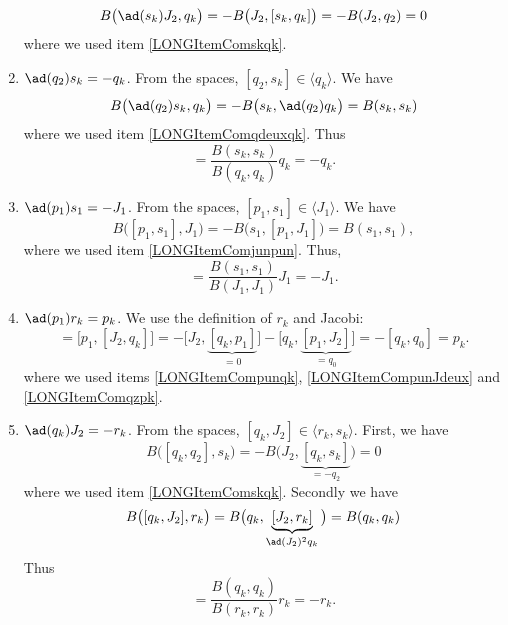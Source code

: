 \begin{enumerate}
		\begin{equation}
			B\big( \ad(s_k)J_2,q_k \big)=-B\big( J_2,[s_k,q_k] \big)=-B(J_2,q_2)=0
		\end{equation}
		where we used item \ref{LONGItemComskqk}.
	\item$\ad(q_2)s_k=-q_k$. From the spaces, $[q_2,s_k]\in\langle q_k\rangle$. We have
		\begin{equation}
			B\big( \ad(q_2)s_k,q_k \big)=-B\big( s_k,\ad(q_2)q_k \big)=B(s_k,s_k)
		\end{equation}
		where we used item \ref{LONGItemComqdeuxqk}. Thus
		\begin{equation}
			[q_2,s_k]=\frac{ B(s_k,s_k) }{ B(q_k,q_k) }q_k=-q_k.
		\end{equation}
	\item$\ad(p_1)s_1=-J_1$. From the spaces, $[p_1,s_1]\in\langle J_1\rangle$. We have
		\begin{equation}
			B\big( [p_1,s_1],J_1 \big)=-B\big( s_1,[p_1,J_1] \big)=B(s_1,s_1),
		\end{equation}
		where we used item \ref{LONGItemComjunpun}. Thus,
		\begin{equation}
			[p_1,s_1]=\frac{ B(s_1,s_1) }{ B(J_1,J_1) }J_1=-J_1.
		\end{equation}
	\item$\ad(p_1)r_k=p_k$\label{LONGItemCompunrk}. We use the definition of $r_k$ and Jacobi:
		\begin{equation}
			[p_1,r_k]=\big[ p_1,[J_2,q_k] \big]=-\big[ J_2,\underbrace{[q_k,p_1]}_{=0} \big]-\big[ q_k,\underbrace{[p_1,J_2]}_{=q_0} \big]=-[q_k,q_0]=p_k.
		\end{equation}
		where we used items \ref{LONGItemCompunqk}, \ref{LONGItemCompunJdeux} and \ref{LONGItemComqzpk}.
	\item$\ad(q_k)J_2=-r_k$\label{LONGItemComkJdeux}. From the spaces, $[q_k,J_2]\in\langle r_k,s_k\rangle$. First, we have
		\begin{equation}
			B\big( [q_k,q_2],s_k \big)=-B\big( J_2,\underbrace{[q_k,s_k]}_{=-q_2} \big)=0
		\end{equation}
		where we used item \ref{LONGItemComskqk}. Secondly we have
		\begin{equation}
			B\big( [q_k,J_2],r_k \big)=B\big( q_k,\underbrace{[J_2,r_k]}_{\ad(J_2)^2q_k} \big)=B(q_k,q_k)
		\end{equation}
		Thus
		\begin{equation}
			[q_k,J_2]=\frac{ B(q_k,q_k) }{ B(r_k,r_k) }r_k=-r_k.
		\end{equation}

\end{enumerate}
